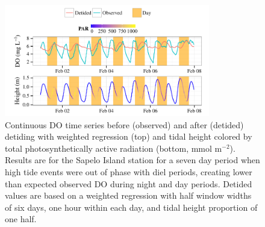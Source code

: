 \documentclass[letterpaper,12pt,oneside]{article}\usepackage[]{graphicx}\usepackage[]{color}
\newenvironment{knitrout}{}{} %
\begin{document}
\centering\vspace*{\fill}
\begin{knitrout}
\color{fgcolor}\begin{figure}[!ht]


{\centering \includegraphics[width=0.8\textwidth]{figure/phase_out} 

}

\caption[Continuous \ac{DO} time series before (observed) and after (detided) detiding with weighted regression (top) and tidal height colored by total photosynthetically active radiation (bottom, mmol m$^{-2}$)]{Continuous \ac{DO} time series before (observed) and after (detided) detiding with weighted regression (top) and tidal height colored by total photosynthetically active radiation (bottom, mmol m$^{-2}$). Results are for the Sapelo Island station for a seven day period when high tide events were out of phase with diel periods, creating lower than expected observed \ac{DO} during night and day periods. Detided values are based on a weighted regression with half window widths of six days, one hour within each day, and tidal height proportion of one half.\label{fig:phase_out}}
\end{figure}


\end{knitrout}
\vfill
\clearpage
\end{document}
